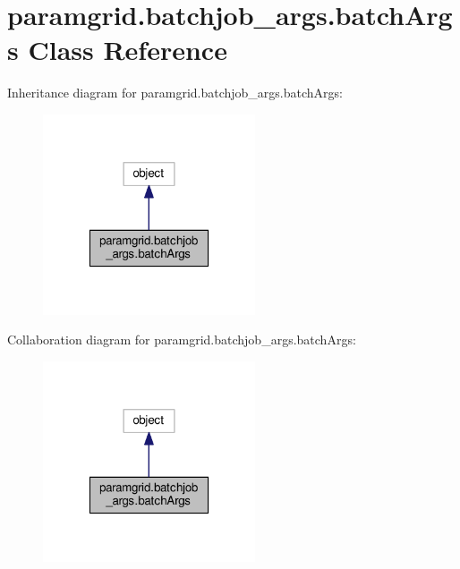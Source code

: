 \hypertarget{classparamgrid_1_1batchjob__args_1_1batchArgs}{}\section{paramgrid.\+batchjob\+\_\+args.\+batch\+Args Class Reference}
\label{classparamgrid_1_1batchjob__args_1_1batchArgs}


Inheritance diagram for paramgrid.\+batchjob\+\_\+args.\+batch\+Args\+:
\nopagebreak
\begin{figure}[H]
\begin{center}
\leavevmode
\includegraphics[width=178pt]{classparamgrid_1_1batchjob__args_1_1batchArgs__inherit__graph}
\end{center}
\end{figure}


Collaboration diagram for paramgrid.\+batchjob\+\_\+args.\+batch\+Args\+:
\nopagebreak
\begin{figure}[H]
\begin{center}
\leavevmode
\includegraphics[width=178pt]{classparamgrid_1_1batchjob__args_1_1batchArgs__coll__graph}
\end{center}
\end{figure}
